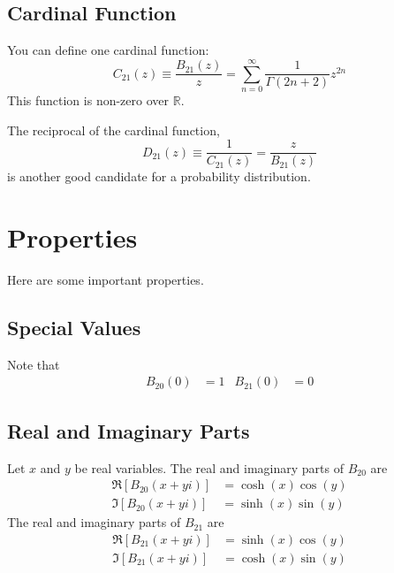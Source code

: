 \subsection{Cardinal Function}
You can define one cardinal function:
\begin{equation}
    C_{21}(z) \equiv \frac{B_{21}(z)}{z} = \sum_{n = 0}^{\infty} \frac{1}{\Gamma(2n+2)} z^{2n}
\end{equation}
This function is non-zero over $\mathbb{R}$.

The reciprocal of the cardinal function,
\begin{equation}
    D_{21}(z) \equiv \frac{1}{C_{21}(z)} = \frac{z}{B_{21}(z)}
\end{equation}
is another good candidate for a probability distribution.
\section{Properties}
Here are some important properties.
\subsection{Special Values}
Note that
\begin{align}
    B_{20}(0) &= 1 & B_{21}(0) &= 0
\end{align}
\subsection{Real and Imaginary Parts}
Let $x$ and $y$ be real variables. The real and imaginary parts of $B_{20}$ are
\begin{align}
    \Re\left[ B_{20}(x + yi) \right] &= \cosh(x) \cos(y) \\
    \Im\left[ B_{20}(x + yi) \right] &= \sinh(x) \sin(y)
\end{align}
The real and imaginary parts of $B_{21}$ are
\begin{align}
    \Re\left[ B_{21}(x + yi) \right] &= \sinh(x) \cos(y) \\
    \Im\left[ B_{21}(x + yi) \right] &= \cosh(x) \sin(y)
\end{align}
